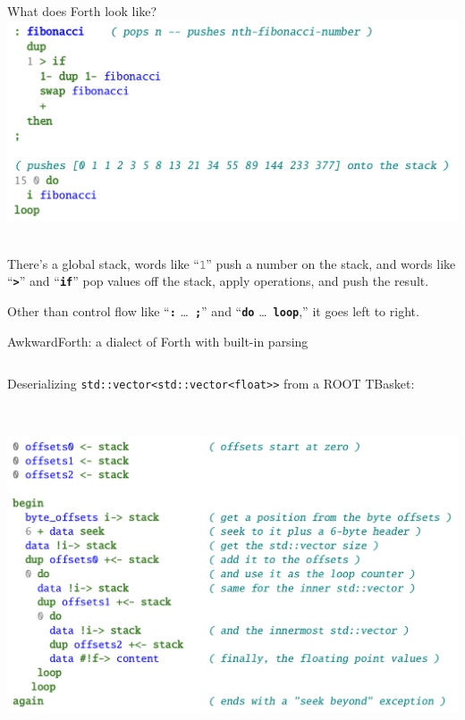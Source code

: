 \documentclass[aspectratio=169]{beamer}
\begin{document}
\begin{frame}{What does Forth look like?}
\large
\vspace{0.3 cm}
\mbox{ } \hfill \includegraphics[width=0.93\linewidth]{forth-example.png} \hfill \mbox{ }

There's a global stack, words like ``\textcolor{gray}{\tt 1}'' push a number on the stack, and words like ``\textcolor{OliveGreen}{\tt\textbf{>}}'' and ``\textcolor{OliveGreen}{\tt\textbf{if}}'' pop values off the stack, apply operations, and push the result.

\vspace{0.2 cm}
Other than control flow like ``\textcolor{OliveGreen}{\tt\textbf{:}} \ldots\ \textcolor{OliveGreen}{\tt\textbf{;}}'' and ``\textcolor{OliveGreen}{\tt\textbf{do}} \ldots\ \textcolor{OliveGreen}{\tt\textbf{loop}},'' it goes left to right.
\end{frame}

\begin{frame}{AwkwardForth: a dialect of Forth with built-in parsing}
\large
\vspace{0.25 cm}
\begin{columns}
Deserializing \texttt{std::vector<std::vector<float>>} from a ROOT TBasket:
\end{columns}

\vspace{0.05 cm}
\mbox{ } \hfill \includegraphics[width=0.83\linewidth]{forth-parsing-example.png} \hfill \mbox{ }
\end{frame}
\end{document}
